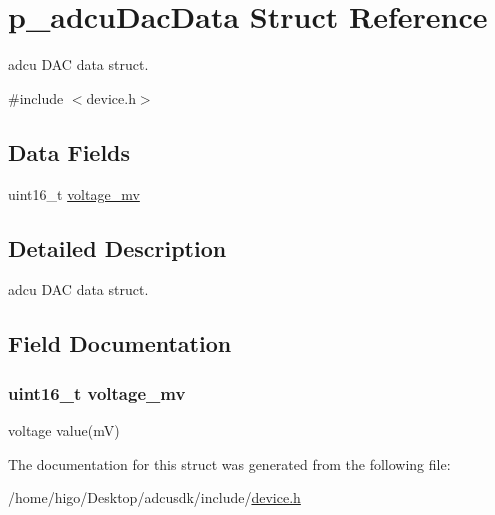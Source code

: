 \hypertarget{structp__adcuDacData}{}\section{p\+\_\+adcu\+Dac\+Data Struct Reference}
\label{structp__adcuDacData}


adcu D\+AC data struct.  




{\ttfamily \#include $<$device.\+h$>$}

\subsection*{Data Fields}
\begin{DoxyCompactItemize}
\item 
uint16\+\_\+t \hyperlink{structp__adcuDacData_a07ff6e86637a4540af822541b93abb00}{voltage\+\_\+mv}
\end{DoxyCompactItemize}


\subsection{Detailed Description}
adcu D\+AC data struct. 

\subsection{Field Documentation}
\subsubsection[{\texorpdfstring{voltage\+\_\+mv}{voltage_mv}}]{\setlength{\rightskip}{0pt plus 5cm}uint16\+\_\+t voltage\+\_\+mv}\hypertarget{structp__adcuDacData_a07ff6e86637a4540af822541b93abb00}{}\label{structp__adcuDacData_a07ff6e86637a4540af822541b93abb00}
voltage value(m\+V) 

The documentation for this struct was generated from the following file\+:\begin{DoxyCompactItemize}
\item 
/home/higo/\+Desktop/adcusdk/include/\hyperlink{device_8h}{device.\+h}\end{DoxyCompactItemize}
